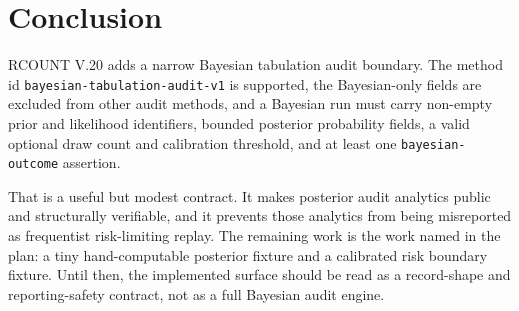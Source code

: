 \section{Conclusion}

RCOUNT V.20 adds a narrow Bayesian tabulation audit boundary. The method id
\texttt{bayesian-tabulation-audit-v1} is supported, the Bayesian-only fields
are excluded from other audit methods, and a Bayesian run must carry non-empty
prior and likelihood identifiers, bounded posterior probability fields, a valid
optional draw count and calibration threshold, and at least one
\texttt{bayesian-outcome} assertion.

That is a useful but modest contract. It makes posterior audit analytics public
and structurally verifiable, and it prevents those analytics from being
misreported as frequentist risk-limiting replay. The remaining work is the work
named in the plan: a tiny hand-computable posterior fixture and a calibrated
risk boundary fixture. Until then, the implemented surface should be read as a
record-shape and reporting-safety contract, not as a full Bayesian audit engine.
